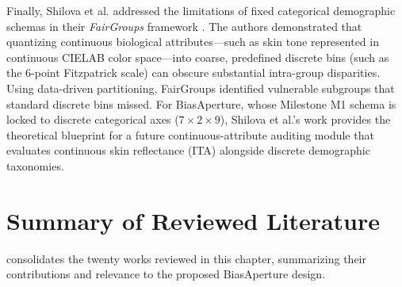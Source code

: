 Finally, Shilova et al. addressed the limitations of fixed categorical demographic schemas in their \emph{FairGroups} framework \cite{shilova2025fairgroups}. The authors demonstrated that quantizing continuous biological attributes---such as skin tone represented in continuous CIELAB color space---into coarse, predefined discrete bins (such as the 6-point Fitzpatrick scale) can obscure substantial intra-group disparities. Using data-driven partitioning, FairGroups identified vulnerable subgroups that standard discrete bins missed. For BiasAperture, whose Milestone M1 schema is locked to discrete categorical axes ($7 \times 2 \times 9$), Shilova et al.'s work provides the theoretical blueprint for a future continuous-attribute auditing module that evaluates continuous skin reflectance (ITA) alongside discrete demographic taxonomies.


\section{Summary of Reviewed Literature}
\label{sec:lit_summary}

 consolidates the twenty works reviewed in this chapter, summarizing their contributions and relevance to the proposed BiasAperture design.

